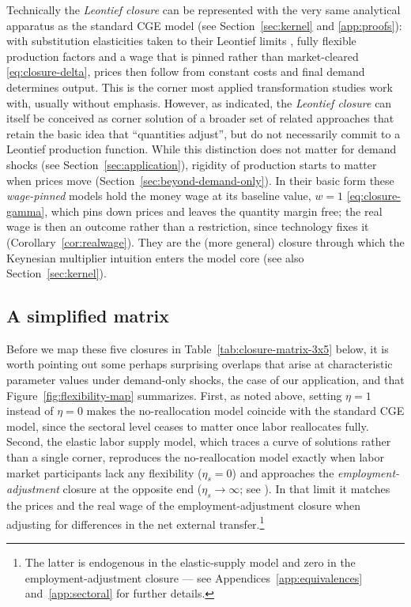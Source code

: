 Technically the \emph{Leontief closure} can be represented with the very same analytical apparatus as the standard CGE model (see Section~\ref{sec:kernel} and \ref{app:proofs}): with substitution elasticities taken to their Leontief limits \citep[see][]{Leontief.1936}, fully flexible production factors and a wage that is pinned rather than market-cleared \eqref{eq:closure-delta}, prices then follow from constant costs and final demand determines output. This is the corner most applied transformation studies work with, usually without emphasis. However, as indicated, the \emph{Leontief closure} can itself be conceived as corner solution of a broader set of related approaches that retain the basic idea that ``quantities adjust'', but do not necessarily commit to a Leontief production function. While this distinction does not matter for demand shocks (see Section~\ref{sec:application}), rigidity of production starts to matter when prices move (Section~\ref{sec:beyond-demand-only}). In their basic form these \textit{wage-pinned} models hold the money wage at its baseline value, $w=1$ \eqref{eq:closure-gamma}, which pins down prices and leaves the quantity margin free; the real wage is then an outcome rather than a restriction, since technology fixes it (Corollary~\ref{cor:realwage}). They are the (more general) closure through which the Keynesian multiplier intuition enters the model core (see also Section~\ref{sec:kernel}).

\subsection{A simplified matrix}\label{subsec:matrix}

Before we map these five closures in Table~\ref{tab:closure-matrix-3x5} below, it is worth pointing out some perhaps surprising overlaps that arise at characteristic parameter values under demand-only shocks, the case of our application, and that Figure~\ref{fig:flexibility-map} summarizes. First, as noted above, setting $\eta=1$ instead of $\eta=0$ makes the no-reallocation model coincide with the standard CGE model, since the sectoral level ceases to matter once labor reallocates fully. Second, the elastic labor supply model, which traces a curve of solutions rather than a single corner, reproduces the no-reallocation model exactly when labor market participants lack any flexibility ($\eta_s=0$) and approaches the \textit{employment-adjustment} closure at the opposite end ($\eta_s \to \infty$; see \citealp{Lagakos.2013,Galle.2023}). In that limit it matches the prices and the real wage of the employment-adjustment closure when adjusting for differences in the net external transfer.\footnote{The latter is endogenous in the elastic-supply model and zero in the employment-adjustment closure --- see Appendices~\ref{app:equivalences} and~\ref{app:sectoral} for further details.}

